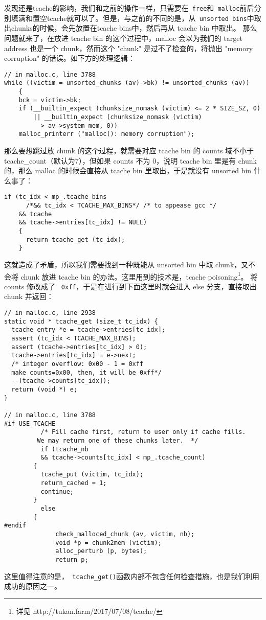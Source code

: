 发现还是tcache的影响，我们和之前的操作一样，只需要在\verb+ free+和\verb+ malloc+前后分别填满和置空tcache就可以了。但是，与之前的不同的是，从\verb+ unsorted bins+中取出chunks的时候，会先放置在tcache bins中，然后再从 tcache bin 中取出。
那么问题就来了，在放进 tcache bin 的这个过程中，malloc 会以为我们的 target address 也是一个 chunk，然而这个 "chunk" 是过不了检查的，将抛出 "memory corruption" 的错误。如下方的处理逻辑：

\begin{verbatim}
// in malloc.c, line 3788
while ((victim = unsorted_chunks (av)->bk) != unsorted_chunks (av))
    {
    bck = victim->bk;
    if (__builtin_expect (chunksize_nomask (victim) <= 2 * SIZE_SZ, 0)
        || __builtin_expect (chunksize_nomask (victim)
	      > av->system_mem, 0))
    malloc_printerr ("malloc(): memory corruption");
\end{verbatim}

那么要想跳过放 chunk 的这个过程，就需要对应 tcache bin 的 counts 域不小于 tcache\_count（默认为7），但如果 counts 不为 0，说明 tcache bin 里是有 chunk 的，那么 malloc 的时候会直接从 tcache bin 里取出，于是就没有 unsorted bin 什么事了：

\begin{verbatim}
if (tc_idx < mp_.tcache_bins
      /*&& tc_idx < TCACHE_MAX_BINS*/ /* to appease gcc */
    && tcache
    && tcache->entries[tc_idx] != NULL)
    {
      return tcache_get (tc_idx);
    }
\end{verbatim}

这就造成了矛盾，所以我们需要找到一种既能从 unsorted bin 中取 chunk，又不会将 chunk 放进 tcache bin 的办法。这里用到的技术是，tcache poisoning\footnote{详见 http://tukan.farm/2017/07/08/tcache/}。
将 counts 修改成了 \verb+ 0xff+，于是在进行到下面这里时就会进入 else 分支，直接取出 chunk 并返回：

\begin{verbatim}
// in malloc.c, line 2938
static void * tcache_get (size_t tc_idx) {
  tcache_entry *e = tcache->entries[tc_idx];
  assert (tc_idx < TCACHE_MAX_BINS);
  assert (tcache->entries[tc_idx] > 0);
  tcache->entries[tc_idx] = e->next;
  /* integer overflow: 0x00 - 1 = 0xff 
  make counts=0x00, then, it will be 0xff*/
  --(tcache->counts[tc_idx]);  
  return (void *) e;
}

// in malloc.c, line 3788
#if USE_TCACHE
          /* Fill cache first, return to user only if cache fills.
         We may return one of these chunks later.  */
          if (tcache_nb
          && tcache->counts[tc_idx] < mp_.tcache_count)
        {
          tcache_put (victim, tc_idx);
          return_cached = 1;
          continue;
        }
          else
        {
#endif
              check_malloced_chunk (av, victim, nb);
              void *p = chunk2mem (victim);
              alloc_perturb (p, bytes);
              return p;
\end{verbatim}

这里值得注意的是，\verb+ tcache_get()+函数内部不包含任何检查措施，也是我们利用成功的原因之一。



\newpage
